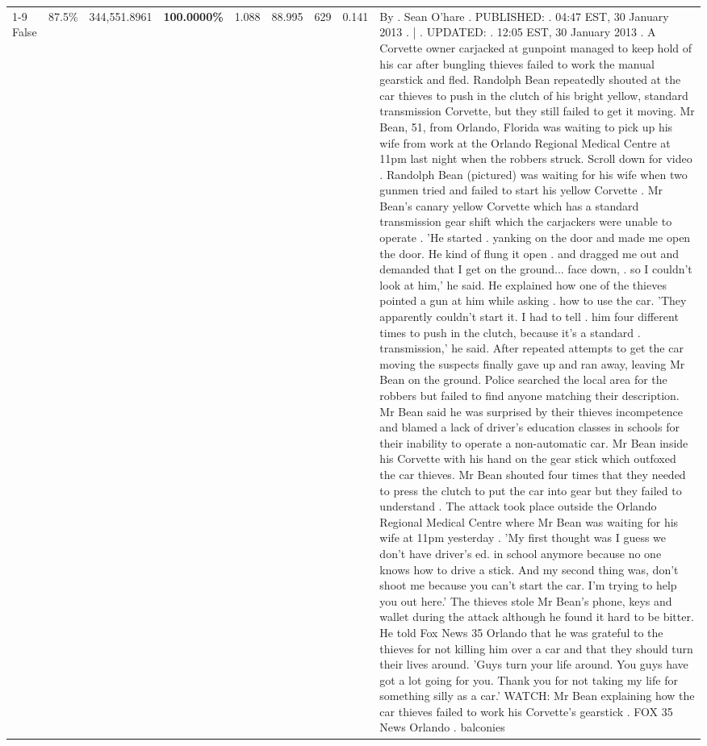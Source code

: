 \begin{table}[H]
\begin{tabular}{lllrlllll}
\cline{1-9} \cline{2-9}
False & 87.5\% & 344,551.8961 & \bfseries \color{red} 100.0000\% & 1.088 & 88.995 & 629 & 0.141 & By . Sean O'hare . PUBLISHED: . 04:47 EST, 30 January 2013 . | . UPDATED: . 12:05 EST, 30 January 2013 . A Corvette owner carjacked at gunpoint managed to keep hold of his car after bungling thieves failed to work the manual gearstick and fled. Randolph Bean repeatedly shouted at the car thieves to push in the clutch of his bright yellow, standard transmission Corvette, but they still failed to get it moving. Mr Bean, 51, from Orlando, Florida was waiting to pick up his wife from work at the Orlando Regional Medical Centre at 11pm last night when the robbers struck. Scroll down for video . Randolph Bean (pictured) was waiting for his wife when two gunmen tried and failed to start his yellow Corvette . Mr Bean's canary yellow Corvette which has a standard transmission gear shift which the carjackers were unable to operate . 'He started . yanking on the door and made me open the door. He kind of flung it open . and dragged me out and demanded that I get on the ground... face down, . so I couldn't look at him,' he said. He explained how one of the thieves pointed a gun at him while asking . how to use the car. 'They apparently couldn't start it. I had to tell . him four different times to push in the clutch, because it's a standard . transmission,' he said. After repeated attempts to get the car moving the suspects finally gave up and ran away, leaving Mr Bean on the ground. Police searched the local area for the robbers but failed to find anyone matching their description. Mr Bean said he was surprised by their thieves incompetence and blamed a lack of driver's education classes in schools for their inability to operate a non-automatic car. Mr Bean inside his Corvette with his hand on the gear stick which outfoxed the car thieves. Mr Bean shouted four times that they needed to press the clutch to put the car into gear but they failed to understand . The attack took place outside the Orlando Regional Medical Centre where Mr Bean was waiting for his wife at 11pm yesterday . 'My first thought was I guess we don't have driver's ed. in school anymore because no one knows how to drive a stick. And my second thing was, don't shoot me because you can't start the car. I'm trying to help you out here.' The thieves stole Mr Bean's phone, keys and wallet during the attack although he found it hard to be bitter. He told Fox News 35 Orlando that he was grateful to the thieves for not killing him over a car and that they should turn their lives around. 'Guys turn your life around. You guys have got a lot going for you. Thank you for not taking my life for something silly as a car.' WATCH: Mr Bean explaining how the car thieves failed to work his Corvette's gearstick . FOX 35 News Orlando . balconies \\

\end{tabular}
\end{table}
